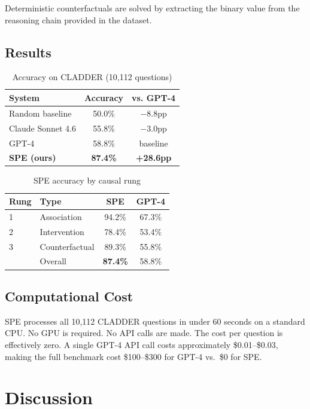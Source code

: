 \documentclass{article}
\begin{document}
Deterministic counterfactuals are solved by extracting the binary value
from the reasoning chain provided in the dataset.

\subsection{Results}

\begin{table}[h]
\centering
\caption{Accuracy on CLADDER (10,112 questions)}
\begin{tabular}{lcc}
\toprule
\textbf{System} & \textbf{Accuracy} & \textbf{vs. GPT-4} \\
\midrule
Random baseline & 50.0\% & $-8.8$pp \\
Claude Sonnet 4.6 & 55.8\% & $-3.0$pp \\
GPT-4 \cite{jin2023cladder} & 58.8\% & baseline \\
\textbf{SPE (ours)} & \textbf{87.4\%} & \textbf{+28.6pp} \\
\bottomrule
\end{tabular}
\end{table}

\begin{table}[h]
\centering
\caption{SPE accuracy by causal rung}
\begin{tabular}{llcc}
\toprule
\textbf{Rung} & \textbf{Type} & \textbf{SPE} & \textbf{GPT-4} \\
\midrule
1 & Association    & 94.2\% & 67.3\% \\
2 & Intervention   & 78.4\% & 53.4\% \\
3 & Counterfactual & 89.3\% & 55.8\% \\
\midrule
  & Overall        & \textbf{87.4\%} & 58.8\% \\
\bottomrule
\end{tabular}
\end{table}

\subsection{Computational Cost}

SPE processes all 10,112 CLADDER questions in under 60 seconds on a
standard CPU. No GPU is required. No API calls are made. The cost per
question is effectively zero. A single GPT-4 API call costs approximately
\$0.01--\$0.03, making the full benchmark cost \$100--\$300 for GPT-4
vs.\ \$0 for SPE.

\section{Discussion}
\end{document}
